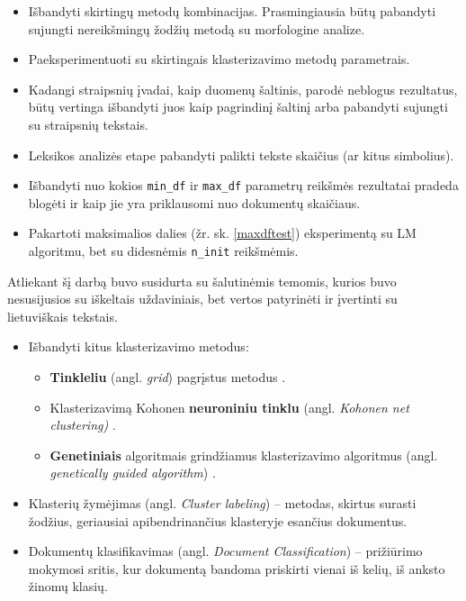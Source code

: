 \documentclass{VUMIFInfBakalaurinis}
\begin{document}
\begin{itemize}
\item
  Išbandyti skirtingų metodų kombinacijas. Prasmingiausia būtų pabandyti
  sujungti nereikšmingų žodžių metodą su morfologine analize.
\item
  Paeksperimentuoti su skirtingais klasterizavimo metodų parametrais.
\item
  Kadangi straipsnių įvadai, kaip duomenų šaltinis, parodė neblogus
  rezultatus, būtų vertinga išbandyti juos kaip pagrindinį šaltinį arba
  pabandyti sujungti su straipsnių tekstais.
\item
  Leksikos analizės etape pabandyti palikti tekste skaičius (ar kitus
  simbolius).
\item
  Išbandyti nuo kokios \texttt{min\_df} ir \texttt{max\_df} parametrų reikšmės rezultatai
  pradeda blogėti ir kaip jie yra priklausomi nuo dokumentų skaičiaus.
\item
  Pakartoti maksimalios dalies (žr. sk. \ref{maxdftest}) eksperimentą su LM
  algoritmu, bet su didesnėmis \texttt{n\_init} reikšmėmis.
\end{itemize}

Atliekant šį darbą buvo susidurta su šalutinėmis temomis, kurios buvo
nesusijusios su iškeltais uždaviniais, bet vertos patyrinėti ir
įvertinti su lietuviškais tekstais.

\begin{itemize}
\item
  Išbandyti kitus klasterizavimo metodus:

  \begin{itemize}
  \item
    \textbf{Tinkleliu} (angl. \emph{grid}) pagrįstus metodus \cite{mivm2010}.
  \item
    Klasterizavimą Kohonen \textbf{neuroniniu tinklu} (angl.
    \emph{Kohonen net clustering)} \cite{kohonen2007kohonen}.
  \item
    \textbf{Genetiniais} algoritmais grindžiamus klasterizavimo
    algoritmus (angl. \emph{genetically guided algorithm}) \cite{hall1999clustering}.
  \end{itemize}
\item
  Klasterių žymėjimas (angl. \emph{Cluster labeling}) -- metodas,
  skirtus surasti žodžius, geriausiai apibendrinančius klasteryje
  esančius dokumentus.
\item
  Dokumentų klasifikavimas (angl. \emph{Document Classification}) --
  prižiūrimo mokymosi sritis, kur dokumentą bandoma priskirti vienai iš
  kelių, iš anksto žinomų klasių.
\end{itemize}
\end{document}

